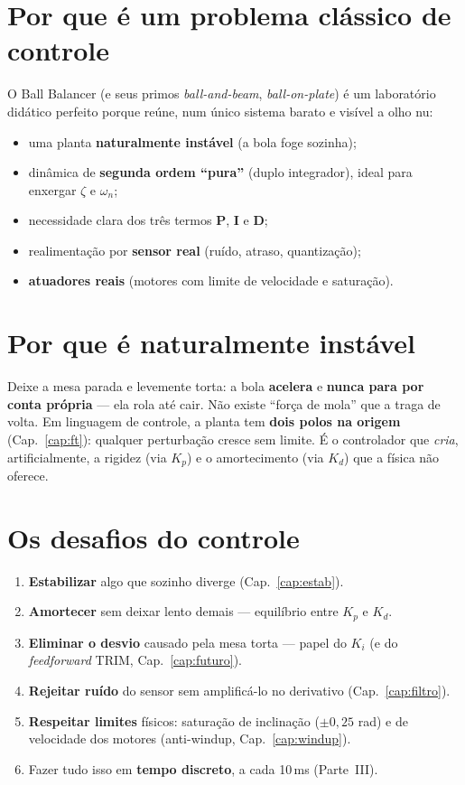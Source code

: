 \section{Por que \'e um problema cl\'assico de controle}
O Ball Balancer (e seus primos \emph{ball-and-beam}, \emph{ball-on-plate}) \'e um
laborat\'orio did\'atico perfeito porque re\'une, num \'unico sistema barato e
vis\'ivel a olho nu:
\begin{itemize}[leftmargin=1.4em]
  \item uma planta \textbf{naturalmente inst\'avel} (a bola foge sozinha);
  \item din\^amica de \textbf{segunda ordem ``pura''} (duplo integrador), ideal
  para enxergar $\zeta$ e $\omega_n$;
  \item necessidade clara dos tr\^es termos \textbf{P}, \textbf{I} e \textbf{D};
  \item realimenta\c{c}\~ao por \textbf{sensor real} (ru\'ido, atraso, quantiza\c{c}\~ao);
  \item \textbf{atuadores reais} (motores com limite de velocidade e satura\c{c}\~ao).
\end{itemize}

\section{Por que \'e naturalmente inst\'avel}
Deixe a mesa parada e levemente torta: a bola \textbf{acelera} e \textbf{nunca
para por conta pr\'opria} --- ela rola at\'e cair. N\~ao existe ``for\c{c}a de
mola'' que a traga de volta. Em linguagem de controle, a planta tem
\textbf{dois polos na origem} (Cap.~\ref{cap:ft}): qualquer perturba\c{c}\~ao cresce sem
limite. \'E o controlador que \emph{cria}, artificialmente, a rigidez (via $K_p$)
e o amortecimento (via $K_d$) que a f\'isica n\~ao oferece.

\section{Os desafios do controle}
\begin{enumerate}[leftmargin=1.5em]
  \item \textbf{Estabilizar} algo que sozinho diverge (Cap.~\ref{cap:estab}).
  \item \textbf{Amortecer} sem deixar lento demais --- equil\'ibrio entre $K_p$ e $K_d$.
  \item \textbf{Eliminar o desvio} causado pela mesa torta --- papel do $K_i$ (e do
  \emph{feedforward} TRIM, Cap.~\ref{cap:futuro}).
  \item \textbf{Rejeitar ru\'ido} do sensor sem amplific\'a-lo no derivativo (Cap.~\ref{cap:filtro}).
  \item \textbf{Respeitar limites} f\'isicos: satura\c{c}\~ao de inclina\c{c}\~ao
  ($\pm0{,}25$ rad) e de velocidade dos motores (anti-windup, Cap.~\ref{cap:windup}).
  \item Fazer tudo isso em \textbf{tempo discreto}, a cada 10\,ms (Parte~III).
\end{enumerate}

